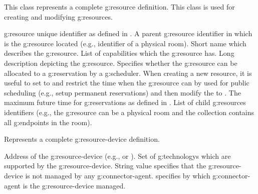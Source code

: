 \begin{Api}
This class represents a complete \gls{g:resource} definition. This class is used for creating and modifying \glspl{g:resource}.
\begin{ApiClassAttributes}
 \Gls{g:resource} unique identifier as defined in .
 A parent \gls{g:resource} identifier in which is the \gls{g:resource} located (e.g., identifier of a physical room).
 Short name which describes the \gls{g:resource}.
 List of capabilities which the \gls{g:resource} has.
 Long description depicting the \gls{g:resource}.
 Specifies whether the \gls{g:resource} can be allocated to a \gls{g:reservation} by a \gls{g:scheduler}. When creating a new resource, it is useful to set  to  and restrict the time when the \gls{g:resource} can by used for public scheduling (e.g., setup permanent reservations) and then modify the  to .
 The maximum future time for \glspl{g:reservation} as defined in .
 List of child \glspl{g:resource} identifiers (e.g., the \gls{g:resource} can be a physical room and the collection  contains all \glspl{g:endpoint} in the room).
\end{ApiClassAttributes}

Represents a complete \gls{g:resource-device} definition.
\begin{ApiClassAttributes}
 Address of the \gls{g:resource-device} (e.g.,  or ).
Set of \glspl{g:technology} which are supported by the \gls{g:resource-device}.
 String value  specifies that the \gls{g:resource-device} is not managed by any \gls{g:connector-agent}.   specifies by which \gls{g:connector-agent} is the \gls{g:resource-device} managed.
\end{ApiClassAttributes}


\end{Api}
